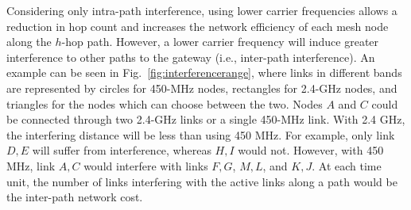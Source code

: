 Considering only intra-path interference, using lower carrier frequencies allows a
reduction in hop count and increases the network efficiency of each mesh node along
the $h$-hop path. However, a lower carrier frequency will induce greater interference
to other paths to the gateway (i.e., inter-path interference). An example can be seen 
in Fig.~\ref{fig:interferencerange}, where
links in different bands are represented by circles for 450-MHz nodes, rectangles for
2.4-GHz nodes, and triangles for the nodes which can choose between the two.
Nodes $A$ and $C$ could be connected through two 2.4-GHz links or a single 450-MHz link.
With 2.4 GHz, the interfering distance will be less than using 450 MHz. For example, only 
link $D,E$ will suffer from interference, whereas $H,I$ would not. However, with 450 MHz,
link $A,C$ would interfere with links $F,G$, $M,L$, and $K,J$. At each time unit, the number of
links interfering with the active links along a path would be the inter-path network cost.

